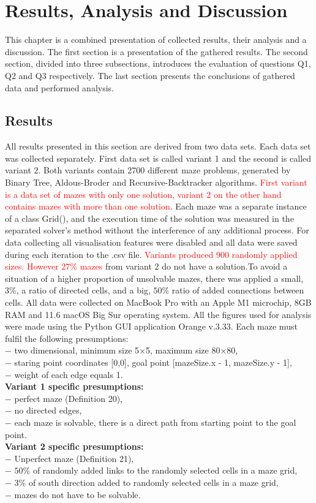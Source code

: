 \chapter{Results, Analysis and Discussion}\label{cha:Results Analysis and Discussion}
This chapter is a combined presentation of collected results, their analysis and a discussion. The first section is a presentation of the gathered results. 
The second section, divided into three subsections, introduces the evaluation of questions Q1, Q2 and Q3 respectively. The last section presents the 
conclusions of gathered data and performed analysis. 
\section{Results}
All results presented in this section are derived from two data sets. Each data set was collected separately. First data set is called variant 1 and the second is 
called variant 2. Both variants contain 2700 different maze problems, generated by Binary Tree, Aldous-Broder and Recursive-Backtracker
algorithms. \textcolor{red}{First variant is a data set of mazes with only one solution, variant 2 on the other hand contains mazes with more than one solution.} 
Each maze was a separate instance of a class Grid(), and the execution time of the solution was measured in the separated solver's method without the interference of
any additional process. For data collecting all visualisation features were disabled and all data were saved during each iteration to the .csv file.
\textcolor{red}{Variants produced  900 randomly applied sizes. However $27\%$ mazes} from variant 2 do not have a solution.To avoid a situation of a higher 
proportion of unsolvable mazes, there was applied a small, $3\%$, a ratio of directed cells, and a big, $50\%$ ratio of added connections between cells.
All data were collected on
MacBook Pro with an Apple M1 microchip, 8GB RAM and 11.6 macOS Big Sur operating system. All the figures used for analysis were made using the Python GUI application Orange v.3.33.
Each maze must fulfil the following presumptions:\\
$-$ two dimensional, minimum size 5$\times$5, maximum size 80$\times$80,\\
$-$ staring point coordinates [0,0], goal point [mazeSize.x - 1, mazeSize.y - 1],\\
$-$ weight of each edge equals 1.\\
\textbf{Variant 1 specific presumptions: }\\
$-$ perfect maze (Definition 20),\\
$-$ no directed edges,\\
$-$ each maze is solvable, there is a direct path from starting point to the goal point.\\
\textbf{Variant 2 specific presumptions: }\\
$-$ Unperfect maze (Definition 21),\\
$-$ $50\%$ of randomly added links to the randomly selected cells in a maze grid,\\
$-$ $3\%$ of south direction added to randomly selected cells in a maze grid,\\
$-$ mazes do not have to be solvable.\\
